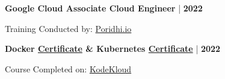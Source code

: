 \documentclass {article}
\begin{document}
    \begin{minipage}[t]{0.7\textwidth}
        \large \textbf{Google Cloud Associate Cloud Engineer} | \textbf{2022}
    \end{minipage}

    \begin{minipage}[t]{0.5\textwidth}
         Training Conducted by: \href{https://poridhi.io/}{Poridhi.io} 
    \end{minipage}

    \begin{minipage}[t]{0.7\textwidth}
         \large \textbf{Docker \href{https://kodekloud.com/certificate-verification/73614B2C60-735B546104-735B181BB8/}{Certificate} \& Kubernetes \href{https://kodekloud.com/certificate-verification/73614B2C60-735B5486E3-735B181BB8/}{Certificate}} | \textbf{2022}
    \end{minipage}

    \begin{minipage}[t]{0.5\textwidth}
         Course Completed on: \href{https://kodekloud.com/}{KodeKloud}
    \end{minipage}
    
\end{document}
